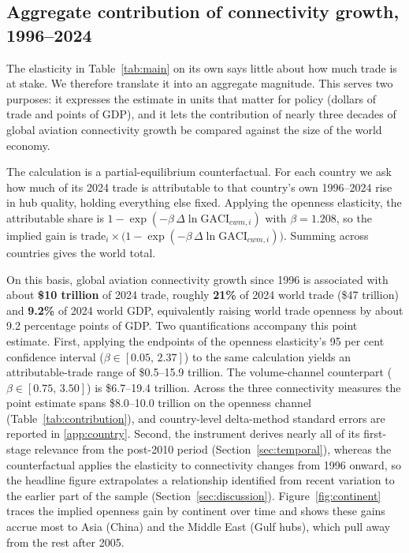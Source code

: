 \subsection{Aggregate contribution of connectivity growth, 1996--2024}
\label{sec:aggregate}
The elasticity in Table~\ref{tab:main} on its own says little about how much trade is at stake. We therefore translate it into an aggregate magnitude. This serves two purposes: it expresses the estimate in units that matter for policy (dollars of trade and points of GDP), and it lets the contribution of nearly three decades of global aviation connectivity growth be compared against the size of the world economy.

The calculation is a partial-equilibrium counterfactual. For each country we ask how much of its 2024 trade is attributable to that country's own 1996--2024 rise in hub quality, holding everything else fixed. Applying the openness elasticity, the attributable share is $1-\exp(-\beta\,\Delta\ln\mathrm{GACI}_{cwm,i})$ with $\beta=1.208$, so the implied gain is $\text{trade}_i\times\bigl(1-\exp(-\beta\,\Delta\ln\mathrm{GACI}_{cwm,i})\bigr)$. Summing across countries gives the world total.

On this basis, global aviation connectivity growth since 1996 is associated with about \textbf{\$10 trillion} of 2024 trade, roughly \textbf{21\%} of 2024 world trade (\$47 trillion) and \textbf{9.2\%} of 2024 world GDP, equivalently raising world trade openness by about 9.2 percentage points of GDP. Two quantifications accompany this point estimate. First, applying the endpoints of the openness elasticity's 95 per cent confidence interval
($\beta\in[0.05,\,2.37]$) to the same calculation yields an attributable-trade range of \$0.5--15.9 trillion. The volume-channel counterpart ($\beta\in[0.75,\,3.50]$) is \$6.7--19.4 trillion. Across the three connectivity measures the point estimate spans \$8.0--10.0 trillion on the openness channel (Table~\ref{tab:contribution}), and country-level delta-method standard errors are reported in \ref{app:country}. Second, the instrument derives nearly all of its first-stage relevance from the post-2010 period (Section~\ref{sec:temporal}), whereas the counterfactual applies the elasticity to connectivity changes from 1996 onward, so the headline figure extrapolates a relationship identified from recent variation to the earlier part of the sample (Section~\ref{sec:discussion}). Figure~\ref{fig:continent} traces the implied openness gain by continent over time and shows these gains accrue most to Asia (China) and the Middle East (Gulf hubs), which pull away from the rest after 2005.

